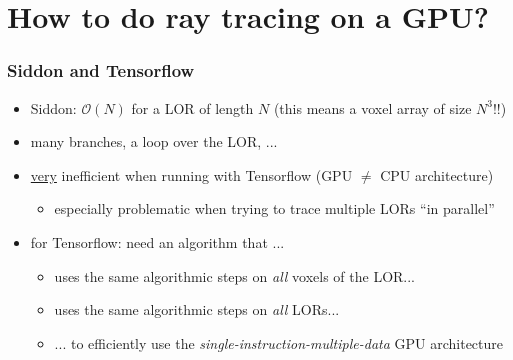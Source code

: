 \documentclass{beamer}
\begin{document}
\section{How to do ray tracing on a GPU?}
\begin{frame}
  \frametitle{Siddon and Tensorflow}
  \begin{itemize}
  \item Siddon: $\mathcal{O}(N)$ for a LOR of length $N$ (this means a voxel array of size $N^3$!!)
    \pause
  \item many branches, a loop over the LOR, ...
    \pause
  \item \underline{very} inefficient when running with Tensorflow (GPU $\neq$ CPU architecture)
    \begin{itemize}
    \item especially problematic when trying to trace multiple LORs ``in parallel''
    \end{itemize}

    \pause
    
    \item for Tensorflow: need an algorithm that ...
      \begin{itemize}
        \item uses the same algorithmic steps on \textsl{all} voxels of the LOR...
        \item uses the same algorithmic steps on \textsl{all} LORs...
        \item ... to efficiently use the \textsl{single-instruction-multiple-data} GPU architecture
      \end{itemize}
  \end{itemize}
\end{frame}
\end{document}
